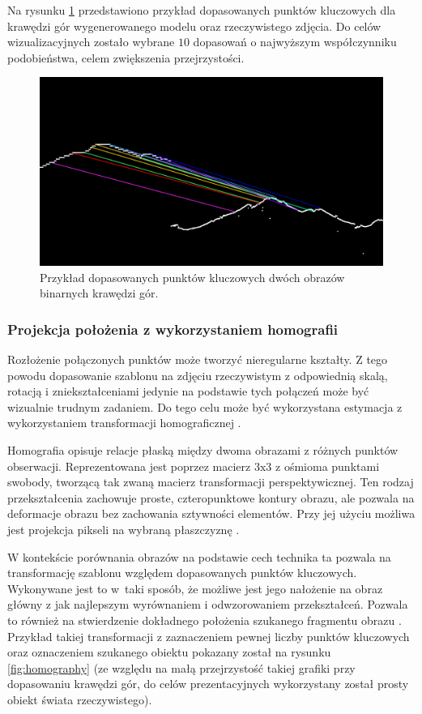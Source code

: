 Na rysunku \ref{fig:matched_points} przedstawiono przykład dopasowanych punktów kluczowych dla krawędzi gór wygenerowanego modelu oraz rzeczywistego zdjęcia. Do celów wizualizacyjnych zostało wybrane $10$ dopasowań o najwyższym współczynniku podobieństwa, celem zwiększenia przejrzystości.

\begin{figure}[!h]
    \centering \includegraphics[width=0.7\linewidth]{img/matched_points.png}
    \caption{Przykład dopasowanych punktów kluczowych dwóch obrazów binarnych krawędzi gór.}
    \label{fig:matched_points}
\end{figure}

\subsubsection{Projekcja położenia z wykorzystaniem homografii} \label{sec:feature_matching_homography}

Rozłożenie połączonych punktów może tworzyć nieregularne kształty. Z tego powodu dopasowanie szablonu na zdjęciu rzeczywistym z odpowiednią skalą, rotacją i zniekształceniami jedynie na podstawie tych połączeń może być wizualnie trudnym zadaniem. Do tego celu może być wykorzystana estymacja z wykorzystaniem transformacji homograficznej \cite{homography_aids}. 

Homografia opisuje relacje płaską między dwoma obrazami z różnych punktów obserwacji. Reprezentowana jest poprzez macierz $3\textrm{x}3$ z ośmioma punktami swobody, tworzącą tak zwaną macierz transformacji perspektywicznej. Ten rodzaj przekształcenia zachowuje proste, czteropunktowe kontury obrazu, ale pozwala na deformacje obrazu bez zachowania sztywności elementów. Przy jej użyciu możliwa jest projekcja pikseli na wybraną płaszczyznę \cite{homography_opencv_explain}\cite{homography_maulion}.


W kontekście porównania obrazów na podstawie cech technika ta pozwala na transformację szablonu względem dopasowanych punktów kluczowych. Wykonywane jest to w~taki sposób, że możliwe jest jego nałożenie na obraz główny z jak najlepszym wyrównaniem i odwzorowaniem przekształceń. Pozwala to również na stwierdzenie dokładnego położenia szukanego fragmentu obrazu \cite{homography_opencv}. Przykład takiej transformacji z zaznaczeniem pewnej liczby punktów kluczowych oraz oznaczeniem szukanego obiektu pokazany został na rysunku \ref{fig:homography} (ze względu na małą przejrzystość takiej grafiki przy dopasowaniu krawędzi gór, do celów prezentacyjnych wykorzystany został prosty obiekt świata rzeczywistego). 


